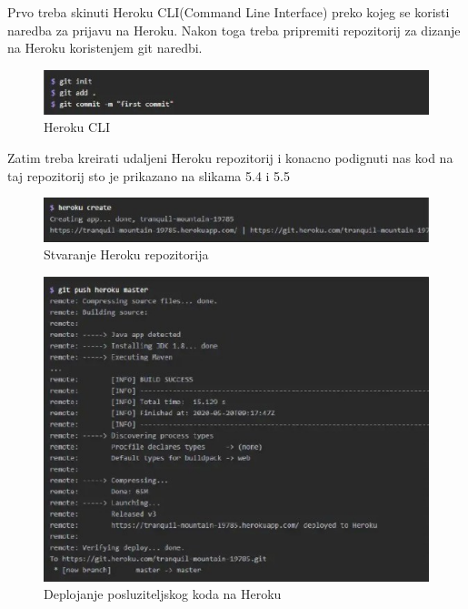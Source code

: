 	Prvo treba skinuti Heroku CLI(Command Line Interface) preko kojeg se koristi naredba za prijavu na Heroku. 
	Nakon toga treba pripremiti repozitorij za dizanje na Heroku koristenjem git naredbi.
	
		\begin{figure}[H]
		
		\includegraphics[width=\textwidth]{slike/druga.jpg} %
		\centering
		\caption{Heroku CLI}
		\label{fig:cli}
	\end{figure}
Zatim treba kreirati udaljeni Heroku repozitorij i konacno podignuti nas kod na taj repozitorij sto je prikazano na slikama 5.4 i 5.5
	\begin{figure}[H]
	
	\includegraphics[width=\textwidth]{slike/treca.jpg} %
	\centering
	\caption{Stvaranje Heroku repozitorija}
	\label{fig:tre}
\end{figure}
\begin{figure}[H]
	
	\includegraphics[width=\textwidth]{slike/cetvrta.jpg} %
	\centering
	\caption{Deplojanje posluziteljskog koda na Heroku}
	\label{fig:cli}
\end{figure}
		
			\eject 
